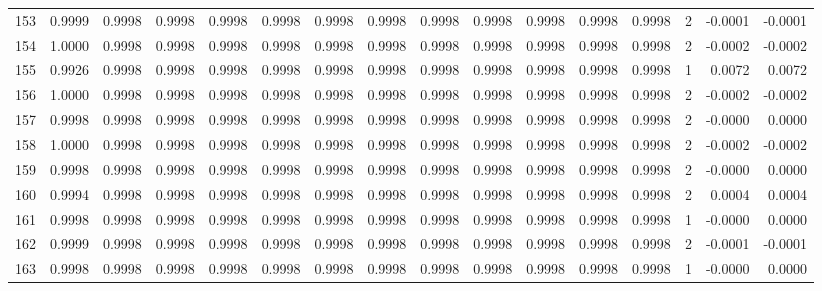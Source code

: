 \begin{tabular}{lrrrrrrrrrrrrrrr}
153 &      0.9999 &  0.9998 &  0.9998 &  0.9998 &  0.9998 &  0.9998 &  0.9998 &  0.9998 &  0.9998 &  0.9998 &   0.9998 &     0.9998 &      2 &                   -0.0001 &                    -0.0001 \\
154 &      1.0000 &  0.9998 &  0.9998 &  0.9998 &  0.9998 &  0.9998 &  0.9998 &  0.9998 &  0.9998 &  0.9998 &   0.9998 &     0.9998 &      2 &                   -0.0002 &                    -0.0002 \\
155 &      0.9926 &  0.9998 &  0.9998 &  0.9998 &  0.9998 &  0.9998 &  0.9998 &  0.9998 &  0.9998 &  0.9998 &   0.9998 &     0.9998 &      1 &                    0.0072 &                     0.0072 \\
156 &      1.0000 &  0.9998 &  0.9998 &  0.9998 &  0.9998 &  0.9998 &  0.9998 &  0.9998 &  0.9998 &  0.9998 &   0.9998 &     0.9998 &      2 &                   -0.0002 &                    -0.0002 \\
157 &      0.9998 &  0.9998 &  0.9998 &  0.9998 &  0.9998 &  0.9998 &  0.9998 &  0.9998 &  0.9998 &  0.9998 &   0.9998 &     0.9998 &      2 &                   -0.0000 &                     0.0000 \\
158 &      1.0000 &  0.9998 &  0.9998 &  0.9998 &  0.9998 &  0.9998 &  0.9998 &  0.9998 &  0.9998 &  0.9998 &   0.9998 &     0.9998 &      2 &                   -0.0002 &                    -0.0002 \\
159 &      0.9998 &  0.9998 &  0.9998 &  0.9998 &  0.9998 &  0.9998 &  0.9998 &  0.9998 &  0.9998 &  0.9998 &   0.9998 &     0.9998 &      2 &                   -0.0000 &                     0.0000 \\
160 &      0.9994 &  0.9998 &  0.9998 &  0.9998 &  0.9998 &  0.9998 &  0.9998 &  0.9998 &  0.9998 &  0.9998 &   0.9998 &     0.9998 &      2 &                    0.0004 &                     0.0004 \\
161 &      0.9998 &  0.9998 &  0.9998 &  0.9998 &  0.9998 &  0.9998 &  0.9998 &  0.9998 &  0.9998 &  0.9998 &   0.9998 &     0.9998 &      1 &                   -0.0000 &                     0.0000 \\
162 &      0.9999 &  0.9998 &  0.9998 &  0.9998 &  0.9998 &  0.9998 &  0.9998 &  0.9998 &  0.9998 &  0.9998 &   0.9998 &     0.9998 &      2 &                   -0.0001 &                    -0.0001 \\
163 &      0.9998 &  0.9998 &  0.9998 &  0.9998 &  0.9998 &  0.9998 &  0.9998 &  0.9998 &  0.9998 &  0.9998 &   0.9998 &     0.9998 &      1 &                   -0.0000 &                     0.0000 \\

\end{tabular}
